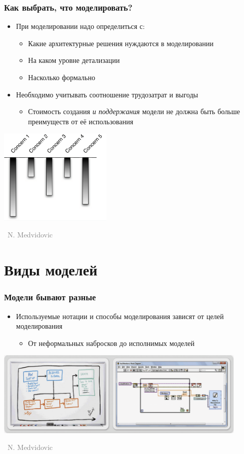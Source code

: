 \documentclass[xetex,mathserif,serif]{beamer}
\newcommand{\attribution}[1] {
	\vspace{-5mm}\begin{flushright}\begin{scriptsize}\textcolor{gray}{\textcopyright\, #1}\end{scriptsize}\end{flushright}
}
\begin{document}
	\begin{frame}
		\frametitle{Как выбрать, что моделировать?}
		\begin{itemize}
			\item При моделировании надо определиться с:
			\begin{itemize}
				\item Какие архитектурные решения нуждаются в моделировании
				\item На каком уровне детализации
				\item Насколько формально
			\end{itemize}
			\item Необходимо учитывать соотношение трудозатрат и выгоды
			\begin{itemize}
				\item Стоимость создания \textit{и поддержания} модели не должна быть больше преимуществ от её использования
			\end{itemize}
		\end{itemize}
		\begin{center}
			\includegraphics[width=0.4\textwidth]{concerns.png}
			\attribution{N. Medvidovic}
		\end{center}
	\end{frame}

	\section{Виды моделей}

	\begin{frame}
		\frametitle{Модели бывают разные}
		\begin{itemize}
			\item Используемые нотации и способы моделирования зависят от целей моделирования
			\begin{itemize}
				\item От неформальных набросков до исполнимых моделей
			\end{itemize}
		\end{itemize}
		\begin{center}
			\includegraphics[width=0.9\textwidth]{sketchesVsFormalNotations.png}
			\attribution{N. Medvidovic}
		\end{center}
	\end{frame}
\end{document}
